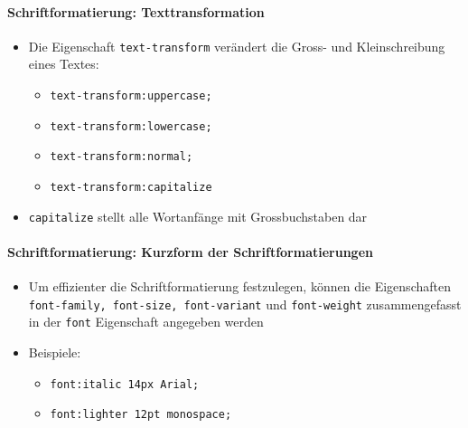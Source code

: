 \paragraph{Schriftformatierung: Texttransformation}
\begin{itemize}[noitemsep,topsep=0pt,leftmargin=*]
    \item Die Eigenschaft \texttt{text-transform} verändert die Gross- und Kleinschreibung eines Textes:
    \begin{itemize}[noitemsep,topsep=0pt,leftmargin=*]
        \item \texttt{text-transform:uppercase;}
        \item \texttt{text-transform:lowercase;}
        \item \texttt{text-transform:normal;}
        \item \texttt{text-transform:capitalize}
    \end{itemize}
    \item \texttt{capitalize} stellt alle Wortanfänge mit Grossbuchstaben dar
\end{itemize}

\paragraph{Schriftformatierung: Kurzform der Schriftformatierungen}
\begin{itemize}[noitemsep,topsep=0pt,leftmargin=*]
    \item Um effizienter die Schriftformatierung festzulegen, können die Eigenschaften \texttt{font-family, font-size, font-variant} und \texttt{font-weight} zusammengefasst in der \texttt{font} Eigenschaft angegeben werden
    \item Beispiele:
    \begin{itemize}[noitemsep,topsep=0pt,leftmargin=*]
        \item \texttt{font:italic 14px Arial;}
        \item \texttt{font:lighter 12pt monospace;}
    \end{itemize}
\end{itemize}

